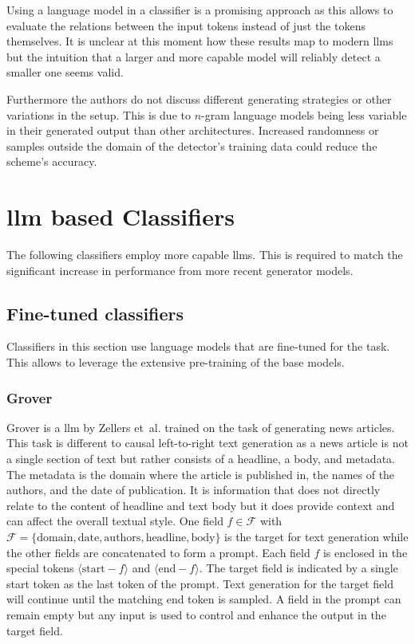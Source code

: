     \begin{remark}
        Using a language model in a classifier is a promising approach as this allows to evaluate the relations between the input tokens instead of just the tokens themselves.
        It is unclear at this moment how these results map to modern \acp{llm} but the intuition that a larger and more capable model will reliably detect a smaller one seems valid.
        
        Furthermore the authors do not discuss different generating strategies or other variations in the setup.
        This is due to $n$-gram language models being less variable in their generated output than other architectures.
        Increased randomness or samples outside the domain of the detector's training data could reduce the scheme's accuracy. 
    \end{remark} 

    \section{\acs{llm} based Classifiers}
    \label{sec:llmBased}
    The following classifiers employ more capable \acp{llm}.
    This is required to match the significant increase in performance from more recent generator models.

    \subsection{Fine-tuned classifiers}
    \label{sec:fineTuned}
    Classifiers in this section use language models that are fine-tuned for the task.
    This allows to leverage the extensive pre-training of the base models.

    \subsubsection{Grover}
    Grover is a \ac{llm} by Zellers et~al. \cite{zellers2020defending} trained on the task of generating news articles.
    This task is different to causal left-to-right text generation as a news article is not a single section of text but rather consists of a headline, a body, and metadata.
    The metadata is the domain where the article is published in, the names of the authors, and the date of publication.
    It is information that does not directly relate to the content of headline and text body but it does provide context and can affect the overall textual style.
    One field $f \in \mathcal{F}$ with $\mathcal{F} = \{\text{domain}, \text{date}, \text{authors}, \text{headline}, \text{body}\}$ is the target for text generation while the other fields are concatenated to form a prompt.
    Each field $f$ is enclosed in the special tokens $\langle \mathrm{start-}f \rangle$ and $\langle \mathrm{end-}f \rangle$.
    The target field is indicated by a single start token as the last token of the prompt.
    Text generation for the target field will continue until the matching end token is sampled.
    A field in the prompt can remain empty but any input is used to control and enhance the output in the target field.

